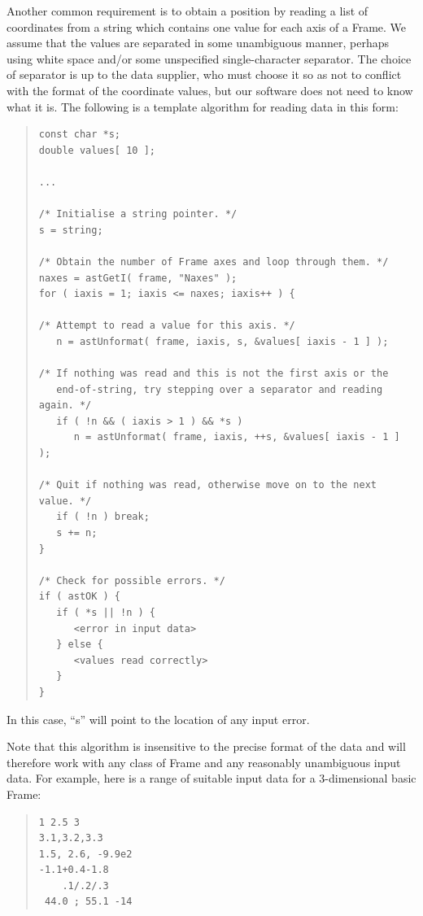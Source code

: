 \documentclass[twoside,11pt]{article}
\begin{document}
Another common requirement is to obtain a position by reading a list
of coordinates from a string which contains one value for each axis of
a Frame. We assume that the values are separated in some unambiguous
manner, perhaps using white space and/or some unspecified
single-character separator. The choice of separator is up to the data
supplier, who must choose it so as not to conflict with the format of
the coordinate values, but our software does not need to know what it
is. The following is a template algorithm for reading data in this
form:

\begin{quote}
\small
\begin{verbatim}
const char *s;
double values[ 10 ];

...

/* Initialise a string pointer. */
s = string;

/* Obtain the number of Frame axes and loop through them. */
naxes = astGetI( frame, "Naxes" );
for ( iaxis = 1; iaxis <= naxes; iaxis++ ) {

/* Attempt to read a value for this axis. */
   n = astUnformat( frame, iaxis, s, &values[ iaxis - 1 ] );

/* If nothing was read and this is not the first axis or the
   end-of-string, try stepping over a separator and reading again. */
   if ( !n && ( iaxis > 1 ) && *s )
      n = astUnformat( frame, iaxis, ++s, &values[ iaxis - 1 ] );

/* Quit if nothing was read, otherwise move on to the next value. */
   if ( !n ) break;
   s += n;
}

/* Check for possible errors. */
if ( astOK ) {
   if ( *s || !n ) {
      <error in input data>
   } else {
      <values read correctly>
   }
}
\end{verbatim}
\normalsize
\end{quote}

In this case, ``s'' will point to the location of any input error.

Note that this algorithm is insensitive to the precise format of the
data and will therefore work with any class of Frame and any
reasonably unambiguous input data. For example, here is a range of
suitable input data for a 3-dimensional basic Frame:

\begin{quote}
\small
\begin{verbatim}
1 2.5 3
3.1,3.2,3.3
1.5, 2.6, -9.9e2
-1.1+0.4-1.8
    .1/.2/.3
 44.0 ; 55.1 -14
\end{verbatim}
\normalsize
\end{quote}
\end{document}
